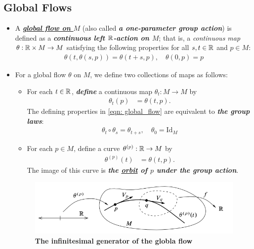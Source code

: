 \documentclass[11pt]{article}
\begin{document}
\subsection{Global Flows}
\begin{itemize}
\item \begin{definition}
A \underline{\emph{\textbf{global flow on $M$}}} (also called \textbf{\emph{a one-parameter group action}}) is defined as a \emph{\textbf{continuous left ${\mathbb R}$-action on $M$}}; that is, a \emph{continuous map} $\theta: {\mathbb R} \times M \rightarrow M$ satisfying the following properties for all $s, t \in {\mathbb R}$ and $p \in M$:
\begin{align}
\theta(t, \theta(s, p)) = \theta(t+s, p), \quad \theta(0, p) = p \label{eqn: global_flow}
\end{align}
\end{definition}

\item For a global flow $\theta$ on $M$, we define two collections of maps as follows:
\begin{itemize}
\item \begin{definition}
For each $t\in {\mathbb R}$, \textbf{\emph{define}} a continuous map $\theta_t: M \rightarrow M$ by 
\begin{align*}
\theta_t(p) &= \theta(t, p). 
\end{align*} The defining properties in \eqref{eqn: global_flow} are equivalent to \emph{\textbf{the group laws}}:
\begin{align}
\theta_t \circ \theta_s = \theta_{t+s}, \quad \theta_0 = \text{Id}_{M} \label{eqn: global_flow_group}
\end{align}
\end{definition}

\item \begin{definition}
For each $p \in M$, define a curve $\theta^{(p)}: {\mathbb R} \rightarrow M$ by
\begin{align*}
\theta^{(p)}(t) &= \theta(t, p).
\end{align*} The image of this curve is \emph{\textbf{the \underline{orbit} of $p$ under the group action}}.
\end{definition}
\end{itemize}

\begin{figure}
\begin{minipage}[htb]{1\linewidth}
  \centering
  \centerline{\includegraphics[scale = 0.42]{infinitesimal_generator_flow.png}}
\end{minipage}
\caption{\footnotesize{\textbf{The infinitesimal generator of the globla flow  \citep{lee2003introduction}}}}
\label{fig: infinitesimal_generator_flow}
\end{figure}


\end{itemize}
\end{document}
